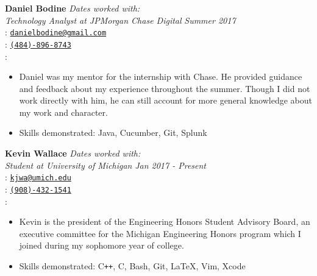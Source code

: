 \documentclass[margin,line,11pt]{resume}
\begin{document}
\begin{resume}
	\textbf{Daniel Bodine} \hfill \textsl{Dates worked with:}\\%
	\textsl{Technology Analyst at JPMorgan Chase Digital} \hfill \textsl{Summer 2017} \\
	\faEnvelope : \href{mailto:danielbodine@gmail.com}{\nolinkurl{danielbodine@gmail.com}} \\
	\faPhone : \href{tel:+1-484-896-8743}{\nolinkurl{(484)-896-8743}} \\
	 \faHome : \rmfamily \\ 
	 \vspace{-4mm}
	 \begin{itemize}
	 	\item Daniel was my mentor for the internship with Chase. He provided guidance and feedback about my experience throughout the summer. Though I did not work directly with him, he can still account for more general knowledge about my work and character.
		\item Skills demonstrated: Java, Cucumber, Git, Splunk
	\end{itemize}
	
	\textbf{Kevin Wallace} \hfill \textsl{Dates worked with:}\\%
	\textsl{Student at University of Michigan} \hfill \textsl{Jan 2017 - Present} \\
	\faEnvelope : \href{mailto:kjwa@umich.edu}{\nolinkurl{kjwa@umich.edu}} \\
	\faPhone : \href{tel:+1-908-432-1541}{\nolinkurl{(908)-432-1541}} \\
	 \faHome : \rmfamily \\ 
	 \vspace{-4mm}
	 \begin{itemize}
	 	\item Kevin is the president of the Engineering Honors Student Advisory Board, an executive committee for the Michigan Engineering Honors program which I joined during my sophomore year of college. 
		\item Skills demonstrated: C\texttt{++}, C, Bash, Git, \LaTeX , Vim, Xcode
	\end{itemize}
	

\end{resume}
\end{document}
